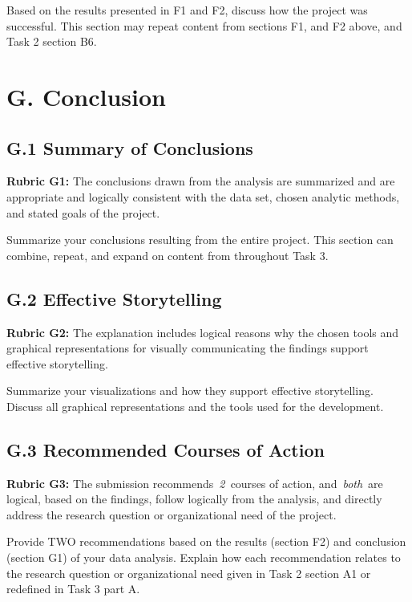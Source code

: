 Based on the results presented in F1 and F2, discuss how the project was
successful. This section may repeat content from sections F1, and F2
above, and Task 2 section B6.

\hypertarget{g.-conclusion}{%
\section{G. Conclusion}\label{g.-conclusion}}

\hypertarget{g.1-summary-of-conclusions}{%
\subsection{G.1 Summary of
Conclusions}\label{g.1-summary-of-conclusions}}

\textbf{Rubric G1:} The conclusions drawn from the analysis are
summarized and are appropriate and logically consistent with the data
set, chosen analytic methods, and stated goals of the project.

Summarize your conclusions resulting from the entire project. This
section can combine, repeat, and expand on content from throughout Task
3.

\hypertarget{g.2-effective-storytelling}{%
\subsection{G.2 Effective
Storytelling}\label{g.2-effective-storytelling}}

\textbf{Rubric G2:} The explanation includes logical reasons why the
chosen tools and graphical representations for visually communicating
the findings support effective storytelling.

Summarize your visualizations and how they support effective
storytelling. Discuss all graphical representations and the tools used
for the development.

\hypertarget{g.3-recommended-courses-of-action}{%
\subsection{G.3 Recommended Courses of
Action}\label{g.3-recommended-courses-of-action}}

\textbf{Rubric G3:} The submission recommends~\emph{2~}courses of
action, and~\emph{both}~are logical, based on the findings, follow
logically from the analysis, and directly address the research question
or organizational need of the project.

Provide TWO recommendations based on the results (section F2) and
conclusion (section G1) of your data analysis. Explain how each
recommendation relates to the research question or organizational need
given in Task 2 section A1 or redefined in Task 3 part A.

